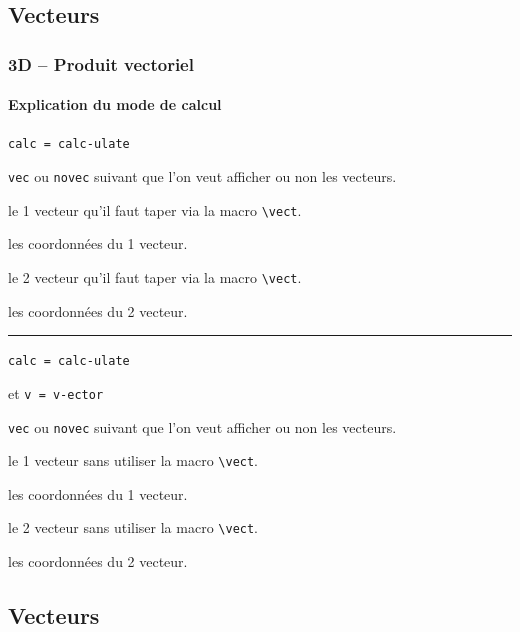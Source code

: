 \documentclass[12pt,a4paper]{book}
\newcommand\env[1]{\texttt{#1}}
\newcommand\macro[1]{\env{\textbackslash{}#1}}
\theoremstyle{definition}
\newcommand\separation{
	\medskip
	\hfill\rule{0.5\textwidth}{0.75pt}\hfill
	\medskip
}
\newcommand\mwhyprefix[2]{%
	\texttt{#1 = #1-#2}%
}
\begin{document}
{{%


\subsection{Vecteurs}

\subsubsection{3D -- Produit vectoriel}

\paragraph{Explication du mode de calcul}



  \hfill \mwhyprefix{calc}{ulate}




 \verb+vec+ ou \verb+novec+ suivant que l'on veut afficher ou non les vecteurs. 

 le 1\ier{} vecteur qu'il faut taper via la macro \macro{vect}.

 les coordonnées du 1\ier{} vecteur.

 le 2\ieme{} vecteur qu'il faut taper via la macro \macro{vect}.

 les coordonnées du 2\ieme{} vecteur.


\separation


  \hfill \mwhyprefix{calc}{ulate}
                                     et \mwhyprefix{v}{ector}



 \verb+vec+ ou \verb+novec+ suivant que l'on veut afficher ou non les vecteurs. 

 le 1\ier{} vecteur sans utiliser la macro \macro{vect}.

 les coordonnées du 1\ier{} vecteur.

 le 2\ieme{} vecteur sans utiliser la macro \macro{vect}.

 les coordonnées du 2\ieme{} vecteur.



\subsection{Vecteurs}

}}
\end{document}
